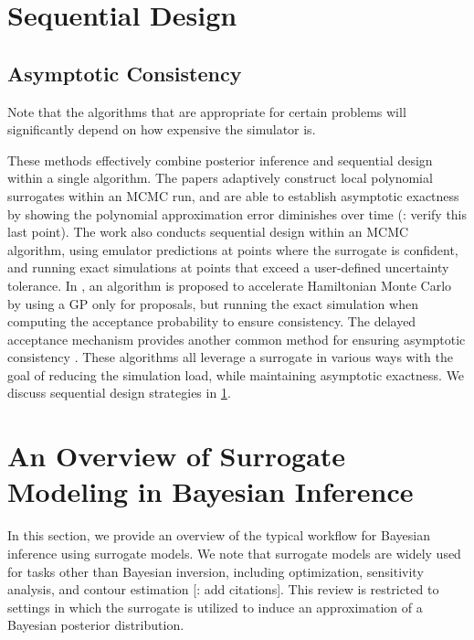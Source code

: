 \documentclass[12pt]{article}
\begin{document}
\section{Sequential Design} \label{sec:seq_design}
\subsection{Asymptotic Consistency}
Note that the algorithms that are appropriate for certain problems will significantly depend on 
how expensive the simulator is.

These methods effectively combine posterior
inference and sequential design within a single algorithm.
The papers \citet{Li_2014,ConradLocalExactMCMC} 
adaptively construct local polynomial surrogates within an MCMC run, and are able to establish asymptotic 
exactness by showing the polynomial 
approximation error diminishes over time (\todo: verify this last point). The work \citep{ActiveLearningMCMC}
also conducts sequential design within an MCMC algorithm, using emulator predictions at points where the 
surrogate is confident, and running exact simulations at points that exceed a user-defined uncertainty tolerance.
In \citet{MCMC_GP_proposal}, an algorithm is proposed to accelerate Hamiltonian Monte Carlo by using a 
GP only for proposals, but running the exact simulation when computing the acceptance probability to 
ensure consistency. The delayed acceptance mechanism provides another common method for ensuring
asymptotic consistency \citep{DelayedAcceptance}.
These algorithms all leverage a surrogate in various ways with the goal of reducing the simulation load, while
maintaining asymptotic exactness.  We discuss sequential design strategies in \cref{sec:seq_design}.










\section{An Overview of Surrogate Modeling in Bayesian Inference}
In this section, we provide an overview of the typical workflow for Bayesian inference using surrogate models. We note 
that surrogate models are widely used for tasks other than Bayesian inversion, including optimization, sensitivity analysis, 
and contour estimation [\todo: add citations]. This review is restricted to settings in which the surrogate is utilized to induce
an approximation of a Bayesian posterior distribution. 
\end{document}
